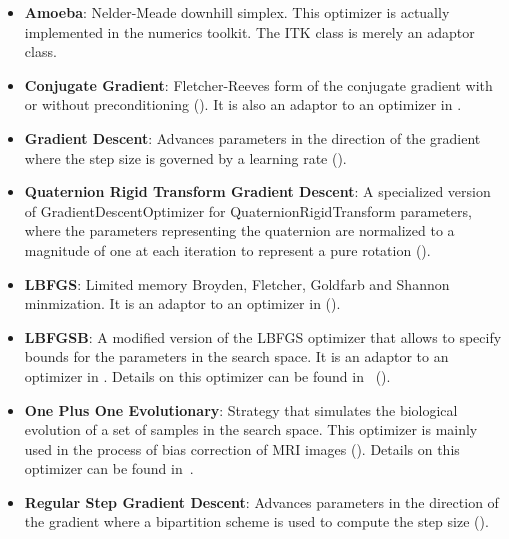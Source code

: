 \begin{itemize}

\item \textbf{Amoeba}: Nelder-Meade downhill simplex.  This optimizer is
actually implemented in the  numerics toolkit.  The ITK class
 is merely an adaptor class.

\item \textbf{Conjugate Gradient}: Fletcher-Reeves form 
of the conjugate gradient with or without preconditioning
(). It is also an adaptor to an optimizer in
.

\item \textbf{Gradient Descent}: Advances parameters in the direction of the
gradient where the step size is governed by a learning rate
(). 

\item \textbf{Quaternion Rigid Transform Gradient Descent}: A specialized
version of GradientDescentOptimizer for QuaternionRigidTransform parameters,
where the parameters representing the quaternion are normalized to a magnitude
of one at each iteration to represent a pure rotation
().

\item \textbf{LBFGS}: Limited memory Broyden, Fletcher, Goldfarb
and Shannon minmization. It is an adaptor to an optimizer in 
().

\item \textbf{LBFGSB}: A modified version of the LBFGS optimizer that allows to
specify bounds for the parameters in the search space.  It is an adaptor to an
optimizer in . Details on this optimizer can be found
in~\cite{Byrd1995,Zhu1997} ().

\item \textbf{One Plus One Evolutionary}: Strategy that simulates the
biological evolution of a set of samples in the search space. This optimizer is
mainly used in the process of bias correction of MRI images
(). Details on this optimizer can be
found in~\cite{Styner2000}.

\item \textbf{Regular Step Gradient Descent}: Advances parameters in the
direction of the gradient where a bipartition scheme is used to compute
the step size (). 


\end{itemize}

